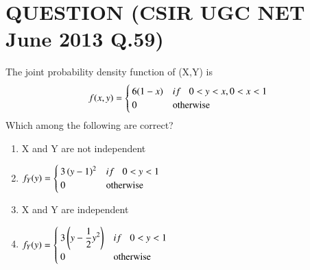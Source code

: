 \documentclass[journal,12pt,twocolumn]{IEEEtran}
\begin{document}
\section*{QUESTION (CSIR UGC NET June 2013 Q.59)}
The joint probability density function of (X,Y) is
\begin{equation}
    f(x,y) =
    \begin{cases}
        6(1-x) & if \hspace{0.3cm}0<y<x ,0<x<1\label{0.0.1} \\
        0      & \text{otherwise}
    \end{cases}
\end{equation}
Which among the following are correct?
\begin{enumerate}\itemsep0.3cm
    \item X and Y are not independent
    \item
          $ f_Y(y) =
              \begin{cases}
                  3\left(y-1\right)^{2} & if \hspace{0.3cm}0<y<1 \\
                  0               & \text{otherwise}
              \end{cases}$
    \item X and Y are independent
    \item $ f_Y(y) =
              \begin{cases}
                  3\left(\displaystyle{y-\frac{1}{2}{y}^2}\right) & if \hspace{0.3cm}0<y<1 \\
                  0                                         & \text{otherwise}
              \end{cases}$
\end{enumerate}
\end{document}
